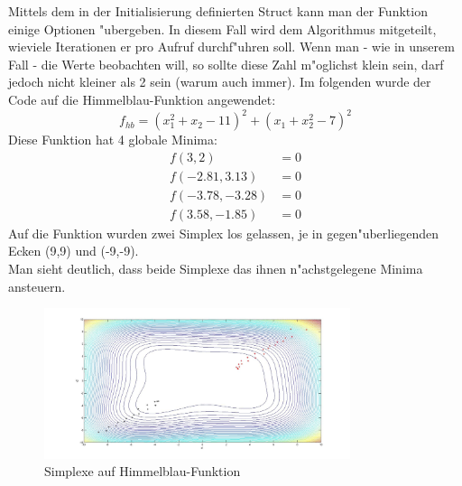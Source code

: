 Mittels dem in der Initialisierung definierten Struct kann man der Funktion einige Optionen "ubergeben. 
In diesem Fall wird dem Algorithmus mitgeteilt, wieviele Iterationen er pro Aufruf durchf"uhren soll. 
Wenn man - wie in unserem Fall - die Werte beobachten will, so sollte diese Zahl m"oglichst klein sein, darf jedoch nicht kleiner als 2 sein (warum auch immer).
Im folgenden wurde der Code auf die Himmelblau-Funktion angewendet: 
\begin{equation}
	f_{hb} = (x_1^2 + x_2 -11)^2 + (x_1+x_2^2-7)^2
\end{equation}
Diese Funktion hat 4 globale Minima: 
\begin{subequations}
	\begin{align}
		f(3,2) &= 0 \\
		f(-2.81,3.13) &= 0\\
		f(-3.78,-3.28) &= 0\\
		f(3.58,-1.85) &= 0
	\end{align}
\end{subequations}
Auf die Funktion wurden zwei Simplex los gelassen, je in gegen"uberliegenden Ecken (9,9) und (-9,-9).\\
Man sieht deutlich, dass beide Simplexe das ihnen n"achstgelegene Minima ansteuern. 
\begin{figure}[h]
	\centering
	\includegraphics[width=0.8\textwidth]{../bilder/HimmelblauHoehen.jpg}%
  	\caption{Simplexe auf Himmelblau-Funktion}%
	\label{fig:HB1}%
\end{figure}

